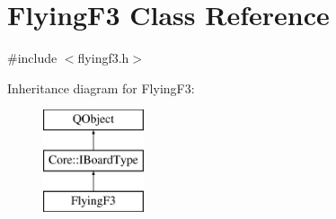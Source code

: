 \hypertarget{class_flying_f3}{\section{Flying\-F3 Class Reference}
\label{class_flying_f3}
}


{\ttfamily \#include $<$flyingf3.\-h$>$}

Inheritance diagram for Flying\-F3\-:\begin{figure}[H]
\begin{center}
\leavevmode
\includegraphics[height=3.000000cm]{class_flying_f3}
\end{center}
\end{figure}
